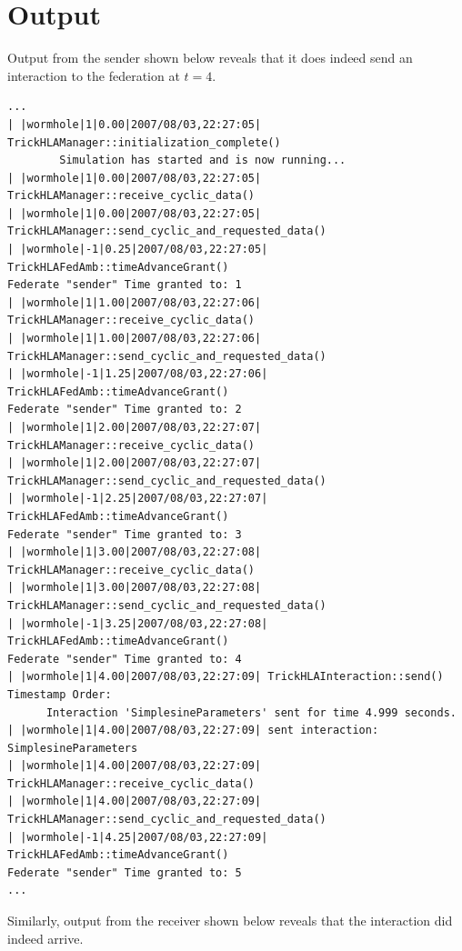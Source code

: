 \section{Output}

Output from the sender shown below reveals that it does indeed send an interaction to the federation at $t=4$.

\begin{lstlisting}[numbers=none,caption={{\em sender} output showing interaction at $t=4$}]
...
| |wormhole|1|0.00|2007/08/03,22:27:05| TrickHLAManager::initialization_complete()
        Simulation has started and is now running...
| |wormhole|1|0.00|2007/08/03,22:27:05| TrickHLAManager::receive_cyclic_data()
| |wormhole|1|0.00|2007/08/03,22:27:05| TrickHLAManager::send_cyclic_and_requested_data()
| |wormhole|-1|0.25|2007/08/03,22:27:05| TrickHLAFedAmb::timeAdvanceGrant()
Federate "sender" Time granted to: 1
| |wormhole|1|1.00|2007/08/03,22:27:06| TrickHLAManager::receive_cyclic_data()
| |wormhole|1|1.00|2007/08/03,22:27:06| TrickHLAManager::send_cyclic_and_requested_data()
| |wormhole|-1|1.25|2007/08/03,22:27:06| TrickHLAFedAmb::timeAdvanceGrant()
Federate "sender" Time granted to: 2
| |wormhole|1|2.00|2007/08/03,22:27:07| TrickHLAManager::receive_cyclic_data()
| |wormhole|1|2.00|2007/08/03,22:27:07| TrickHLAManager::send_cyclic_and_requested_data()
| |wormhole|-1|2.25|2007/08/03,22:27:07| TrickHLAFedAmb::timeAdvanceGrant()
Federate "sender" Time granted to: 3
| |wormhole|1|3.00|2007/08/03,22:27:08| TrickHLAManager::receive_cyclic_data()
| |wormhole|1|3.00|2007/08/03,22:27:08| TrickHLAManager::send_cyclic_and_requested_data()
| |wormhole|-1|3.25|2007/08/03,22:27:08| TrickHLAFedAmb::timeAdvanceGrant()
Federate "sender" Time granted to: 4
| |wormhole|1|4.00|2007/08/03,22:27:09| TrickHLAInteraction::send() Timestamp Order:
      Interaction 'SimplesineParameters' sent for time 4.999 seconds.
| |wormhole|1|4.00|2007/08/03,22:27:09| sent interaction: SimplesineParameters
| |wormhole|1|4.00|2007/08/03,22:27:09| TrickHLAManager::receive_cyclic_data()
| |wormhole|1|4.00|2007/08/03,22:27:09| TrickHLAManager::send_cyclic_and_requested_data()
| |wormhole|-1|4.25|2007/08/03,22:27:09| TrickHLAFedAmb::timeAdvanceGrant()
Federate "sender" Time granted to: 5
...
\end{lstlisting}

Similarly, output from the receiver shown below reveals that
the interaction did indeed arrive.

